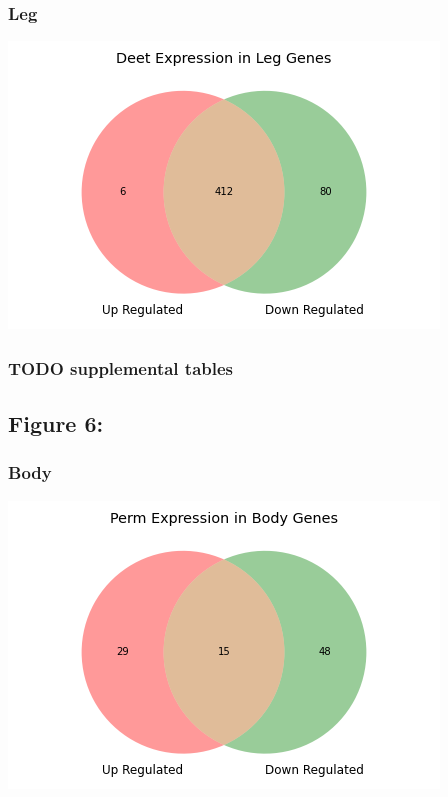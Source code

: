 \documentclass[11pt]{article}
\begin{document}
\subsubsection{Leg}
\label{sec:org2f435e9}
\begin{center}
\includegraphics[width=.9\linewidth]{figure5/DeetLegDeseq.png}
\end{center}
\subsubsection{{\bfseries\sffamily TODO} supplemental tables}
\label{sec:orgb78b77b}
\subsection{Figure 6:}
\label{sec:org305e391}
\subsubsection{Body}
\label{sec:orgf38097f}
\begin{center}
\includegraphics[width=.9\linewidth]{figure6/PermBodyDeseq.png}
\end{center}
\end{document}
